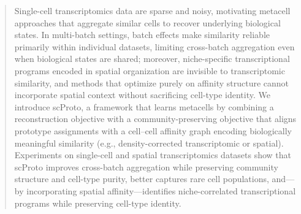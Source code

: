 \begin{abstract}
Single-cell transcriptomics data are sparse and noisy, motivating metacell approaches that aggregate similar cells to recover underlying biological states. In multi-batch settings, batch effects make similarity reliable primarily within individual datasets, limiting cross-batch aggregation even when biological states are shared; moreover, niche-specific transcriptional programs encoded in spatial organization are invisible to transcriptomic similarity, and methods that optimize purely on affinity structure cannot incorporate spatial context without sacrificing cell-type identity. We introduce scProto, a framework that learns metacells by combining a reconstruction objective with a community-preserving objective that aligns prototype assignments with a cell--cell affinity graph encoding biologically meaningful similarity (e.g., density-corrected transcriptomic or spatial). Experiments on single-cell and spatial transcriptomics datasets show that scProto improves cross-batch aggregation while preserving community structure and cell-type purity, better captures rare cell populations, and---by incorporating spatial affinity---identifies niche-correlated transcriptional programs while preserving cell-type identity.
\end{abstract}
